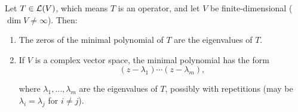 \setcounter{thm}{26}
\begin{thm} 
  \label{thm: eigenvalues are the zeros of the minimal polynomial}
  Let $T \in \mathcal{L}(V)$, which means $T$ is an operator, and let $V$ be finite-dimensional ($\dim V \neq \infty$). Then:
  \begin{enumerate}[label=\textbf{(\alph*)}]
    \item The zeros of the minimal polynomial of $T$ are the eigenvalues of $T$.
    \item If $V$ is a complex vector space, the minimal polynomial has the form
    \begin{equation}
      (z-\lambda_1)\cdots(z-\lambda_m),
    \end{equation}

    where $\lambda_1, \dots, \lambda_m$ are the eigenvalues of $T$, possibly with repetitions (may be $\lambda_i = \lambda_j$ for $i \neq j$).
  \end{enumerate}
\end{thm}
